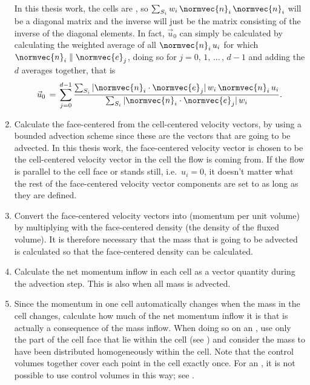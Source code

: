 \begin{enumerate}
    In this thesis work, the cells are , so $\sum_{S_i}w_i\,\normvec{n}_i\,\normvec{n}_i$ will be a diagonal matrix and the inverse will just be the matrix consisting of the inverse of the diagonal elements. In fact, $\vec{u}_0$ can simply be calculated by calculating the weighted average of all $\normvec{n}_i\,u_i$ for which $\normvec{n}_i\parallel \normvec{e}_j$, doing so for $j = 0,\, 1,\,...\,,\,d-1$ and adding the $d$ averages together, that is
    \begin{equation}
    \vec{u}_0 \,=\, \sum_{j=0}^{d-1} \frac{\sum_{S_i}|\normvec{n}_i\cdot\normvec{e}_j|\,w_i\,\normvec{n}_i\,u_i}{\sum_{S_i}|\normvec{n}_i\cdot\normvec{e}_j|\,w_i}.
    \end{equation}
    
    \item Calculate the face-centered  from the cell-centered velocity vectors, by using a bounded advection scheme since these are the vectors that are going to be advected. In this thesis work, the face-centered velocity vector is chosen to be the cell-centered velocity vector in the cell the flow is coming from. If the flow is parallel to the cell face or stands still, i.e.\ $u_i = 0$, it doesn't matter what the rest of the face-centered velocity vector components are set to as long as they are defined.
    
    \item Convert the face-centered velocity vectors into  (momentum per unit volume) by multiplying with the face-centered density (the density of the fluxed volume). It is therefore necessary that the mass that is going to be advected is calculated so that the face-centered density can be calculated.
    
    \item Calculate the net momentum inflow in each cell as a vector quantity during the advection step. This is also when all mass is advected.
    
    \item Since the momentum in one cell automatically changes when the mass in the cell changes, calculate how much of the net momentum inflow it is that is actually a consequence of the mass inflow. When doing so on an , use only the part of the cell face  that lie within the cell (see ) and consider the mass to have been distributed homogeneously within the cell. Note that the control volumes together cover each point in the cell exactly once. For an , it is not possible to use control volumes in this way; see .
    

\end{enumerate}
